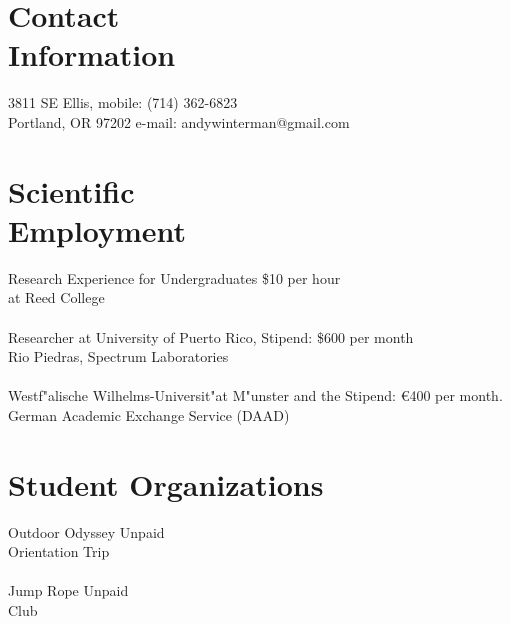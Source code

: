 \documentclass[margin,line]{resume}
\begin{document}
\begin{resume}

    \section{\mysidestyle Contact\\Information}


    3811 SE Ellis,                           \hfill  mobile: (714) 362-6823          \vspace{0mm}\\\vspace{0mm}%
    Portland, OR 97202                         \hfill     e-mail: andywinterman@gmail.com      \vspace{0mm}\\%
  \vspace{-4.5mm}%

    \section{\mysidestyle Scientific\\Employment} 
Research Experience for Undergraduates \hfill\$10 per hour \\ 
at Reed College \ \  \hfill  \\
\vspace{-2mm} \\
Researcher at University of Puerto Rico, \hfill  Stipend: \$600 per month \\
Rio Piedras, Spectrum Laboratories \hfill
\\\vspace{-2mm}\\
Westf"alische Wilhelms-Universit"at M"unster and the \hfill  Stipend: \euro 400 per month.   \\ German Academic Exchange Service (DAAD)



\section{\mysidestyle Student Organizations }

Outdoor Odyssey \hfill Unpaid \\
Orientation Trip \hfill 
\\\vspace{-2mm}\\
Jump Rope \hfill Unpaid \\
Club \hfill 



\end{resume}
\end{document}
